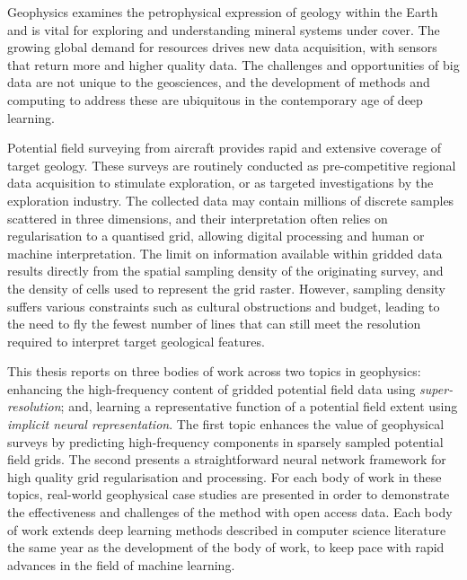 \documentclass[12pt,a4paper,notitlepage]{report} %
\begin{document}

\setcounter{page}{1}

Geophysics examines the petrophysical expression of geology within the Earth and is vital for exploring and understanding mineral systems under cover.
The growing global demand for resources drives new data acquisition, with sensors that return more and higher quality data.
The challenges and opportunities of big data are not unique to the geosciences, and the development of methods and computing to address these are ubiquitous in the contemporary age of deep learning.

Potential field surveying from aircraft provides rapid and extensive coverage of target geology.
These surveys are routinely conducted as pre-competitive regional data acquisition to stimulate exploration, or as targeted investigations by the exploration industry.
The collected data may contain millions of discrete samples scattered in three dimensions, and their interpretation often relies on regularisation to a quantised grid, allowing digital processing and human or machine interpretation.
The limit on information available within gridded data results directly from the spatial sampling density of the originating survey, and the density of cells used to represent the grid raster.
However, sampling density suffers various constraints such as cultural obstructions and budget, leading to the need to fly the fewest number of lines that can still meet the resolution required to interpret target geological features.

This thesis reports on three bodies of work across two topics in geophysics: enhancing the high-frequency content of gridded potential field data using \emph{super-resolution}; and, learning a representative function of a potential field extent using \emph{implicit neural representation}.
The first topic enhances the value of geophysical surveys by predicting high-frequency components in sparsely sampled potential field grids.
The second presents a straightforward neural network framework for high quality grid regularisation and processing.
For each body of work in these topics, real-world geophysical case studies are presented in order to demonstrate the effectiveness and challenges of the method with open access data.
Each body of work extends deep learning methods described in computer science literature the same year as the development of the body of work, to keep pace with rapid advances in the field of machine learning.
\end{document}
